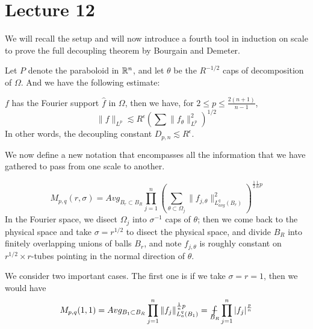 \section*{Lecture 12}
We will recall the setup and will now introduce a fourth tool in induction on scale to prove the full decoupling theorem by Bourgain and Demeter.

Let $P$ denote the paraboloid in $\mathbb{R}^n$, and let $\theta$ be the $R^{-1/2}$ caps of decomposition of $\Omega$. And we have the following estimate:
\begin{theorem}
    $f$ has the Fourier support $\widehat{f}$ in $\Omega$, then we have, for $2\leq p\leq\frac{2(n+1)}{n-1}$,
    \begin{equation*}
        \|f\|_{L^p}\lesssim R^\epsilon\left(\sum\|f_\theta\|_{L^p}^2 \right)^{1/2}
    \end{equation*}
    In other words, the decoupling constant $D_{p,n}\lesssim R^\epsilon$.
\end{theorem}
We now define a new notation that encompasses all the information that we have gathered to pass from one scale to another.

\begin{equation*}
    M_{p,q}(r,\sigma)={Avg}_{B_r\subset B_R}\prod_{j=1}^n\left(\sum_{\theta\subset\Omega_j}\|f_{j,\theta}\|_{L_{avg}^q(B_r)}^2 \right)^{\frac{1}{2}\frac{1}{n}p}
\end{equation*}
In the Fourier space, we disect $\Omega_j$ into $\sigma^{-1}$ caps of $\theta$; then we come back to the physical space and take $\sigma=r^{1/2}$ to disect the physical space, and divide $B_R$ into finitely overlapping unions of balls $B_r$, and note $f_{j,\theta}$ is roughly constant on $r^{1/2}\times r$-tubes pointing in the normal direction of $\theta$.

We consider two important cases. The first one is if we take $\sigma=r=1$,
then we would have
\begin{equation*}
    M_{p,q}(1,1)=Avg_{B_1\subset B_R}\prod_{j=1}^n\|f_j\|_{L_a^q(B_1)}^{\frac{1}{n}p}=\avint_{B_R}\prod_{j=1}^n|f_j|^{\frac{p}{n}}
\end{equation*}

